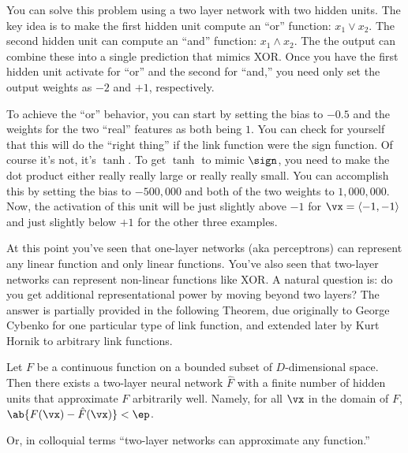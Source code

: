 You can solve this problem using a two layer network with two hidden
units.  The key idea is to make the first hidden unit compute an
``or'' function: $x_1 \lor x_2$.  The second hidden unit can compute
an ``and'' function: $x_1 \land x_2$.  The the output can combine
these into a single prediction that mimics XOR.  Once you have the
first hidden unit activate for ``or'' and the second for ``and,'' you
need only set the output weights as $-2$ and $+1$, respectively.


To achieve the ``or'' behavior, you can start by setting the bias to
$-0.5$ and the weights for the two ``real'' features as both being
$1$.  You can check for yourself that this will do the ``right thing''
if the link function were the sign function.  Of course it's not, it's
$\tanh$.  To get $\tanh$ to mimic $\sign$, you need to make the dot
product either really really large or really really small.  You can
accomplish this by setting the bias to $-500,000$ and both of the two
weights to $1,000,000$.  Now, the activation of this unit will be just
slightly above $-1$ for $\vx = \langle -1,-1 \rangle$ and just
slightly below $+1$ for the other three examples.


At this point you've seen that one-layer networks (aka perceptrons)
can represent any linear function and only linear functions.  You've
also seen that two-layer networks can represent non-linear functions
like XOR.  A natural question is: do you get additional
representational power by moving beyond two layers?  The answer is
partially provided in the following Theorem, due originally to George
Cybenko for one particular type of link function, and extended later
by Kurt Hornik to arbitrary link functions.

\begin{theorem} \label{thm:nnet_twolayer}
%
  Let $F$ be a continuous function on a bounded subset of
  $D$-dimensional space.  Then there exists a two-layer neural network
  $\hat F$ with a finite number of hidden units that approximate $F$
  arbitrarily well.  Namely, for all $\vx$ in the domain of $F$,
  $\ab{F(\vx) - \hat F(\vx)} < \ep$.
\end{theorem}

Or, in colloquial terms ``two-layer networks can approximate any
function.''


